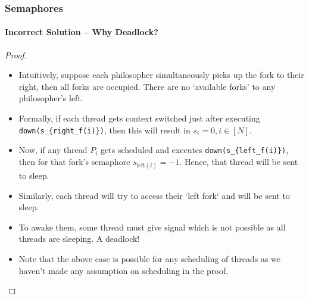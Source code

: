 \documentclass[aspectratio=169, handout, 10pt]{beamer}
\theoremstyle{example}
\begin{document}
\begin{frame}[fragile]\frametitle{Semaphores}\framesubtitle{Incorrect Solution -- Why Deadlock?}
  \begin{proof}
  \begin{itemize}
  \pause\item Intuitively, suppose each philosopher simultaneously picks up the fork to their right, then all forks are occupied. There are no `available forks' to any philosopher's left.
  \pause\item Formally, if each thread gets context switched just after executing \\\verb!down(s_{right_f(i)})!, then this will result in $s_i=0, i \in [N]$. 
  \pause\item Now, if any thread $P_i$ gets scheduled and executes \verb!down(s_{left_f(i)})!, then for that fork's semaphore  $s_{\text{left}(i)} = -1$. Hence, that thread will be sent to sleep.
  \pause\item Similarly, each thread will try to access their `left fork` and will be sent to sleep.
  \pause\item To awake them, some thread must give signal which is not possible as all threads are sleeping. A deadlock!
  \pause\item Note that the above case is possible for any scheduling of threads as we haven't made any assumption on scheduling in the proof.
  \end{itemize}
  \end{proof}
\end{frame}
\end{document}
